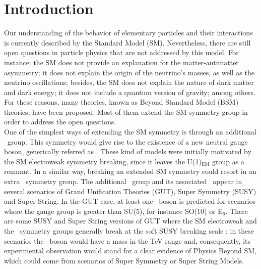 \chapter*{Introduction}

Our understanding of the behavior of elementary particles and their interactions is 
currently described by the Standard Model (SM). Nevertheless, there are still open 
questions in particle physics that are not addressed by this model. For instance: the SM does 
not provide an explanation for the matter-antimatter asymmetry; it does not 
explain the origin of the neutrino's masses, as well as the 
neutrino oscillations; besides, the SM does not explain the nature of dark matter and dark energy;
it does not include a quantum version of gravity; among others. For these reasons, 
many theories, known as Beyond Standard Model (BSM) \cite{BSM} theories, have been proposed.
Most of them extend the SM symmetry group in order to address the open questions. \\

One of the simplest ways of extending the SM symmetry is through an additional
\Uprime~group. This symmetry would give rise to the existence of a new neutral gauge boson, generically 
referred as \Zprime. These kind of models were initially motivated by the 
SM electroweak symmetry breaking, since it leaves the U(1)$_{\text{EM}}$ group 
as a remnant. In a similar way, breaking an extended SM symmetry could resort 
in an extra \Uprime~symmetry group. The additional \Uprime~group and its associated
\Zprime~appear in several scenarios of Grand Unification Theories (GUT), Super Symmetry 
(SUSY) and Super String. In the GUT case, at least one \Zprime~boson
is predicted for scenarios where the gauge group is greater than SU(5), for instance 
SO(10) or E$_{6}$. There are some SUSY and Super String versions of GUT 
where the SM electroweak and the \Uprime~symmetry groups 
generally break at the soft SUSY breaking scale \cite{Langacker:2008yv}; in these scenarios 
the \Zprime~boson would have a mass in the TeV range and, consequently, its experimental
observation would stand for a clear evidence of Physics Beyond SM, which could 
come from scenarios of Super Symmetry or Super String Models. \\

